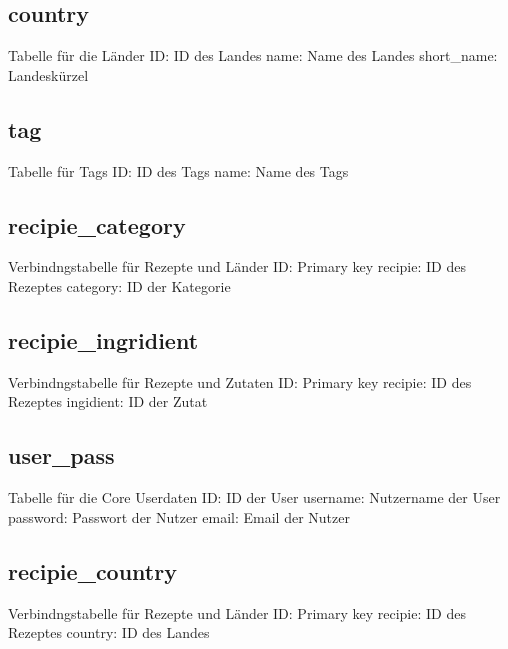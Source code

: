 \documentclass{article}
\begin{document}
\subsection{country}
Tabelle für die Länder
\newline
ID: ID des Landes
\newline
name: Name des Landes
\newline
short\_name: Landeskürzel

\subsection{tag}
Tabelle für Tags
\newline
ID: ID des Tags
\newline
name: Name des Tags

\subsection{recipie\_category}
Verbindngstabelle für Rezepte und Länder
\newline
ID: Primary key
\newline
recipie: ID des Rezeptes
\newline
category: ID der Kategorie

\subsection{recipie\_ingridient}
Verbindngstabelle für Rezepte und Zutaten
\newline
ID: Primary key
\newline
recipie: ID des Rezeptes
\newline
ingidient: ID der Zutat

\subsection{user\_pass}
Tabelle für die Core Userdaten
\newline
ID: ID der User
\newline
username: Nutzername der User
\newline
password: Passwort der Nutzer
\newline
email: Email der Nutzer

\subsection{recipie\_country}
Verbindngstabelle für Rezepte und Länder
\newline
ID: Primary key
\newline
recipie: ID des Rezeptes
\newline
country: ID des Landes
\end{document}
